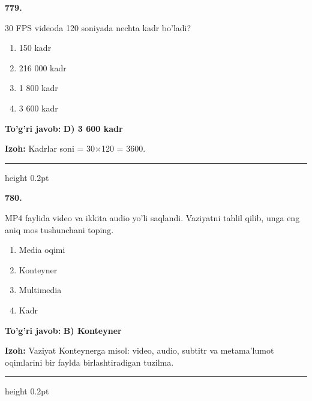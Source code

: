 \documentclass[10pt,a4paper,oneside]{article}
\begin{document}
\noindent\textbf{\color{ink}779.}
\par
30 FPS videoda 120 soniyada nechta kadr bo'ladi?
\begin{enumerate}[label=\Alph*),leftmargin=9mm]
\item 150 kadr
\item 216 000 kadr
\item 1 800 kadr
\item 3 600 kadr
\end{enumerate}
\begin{tcolorbox}[enhanced,breakable,colback=teal!4,colframe=teal!50!black,boxrule=0.5pt,arc=1.1mm,left=3mm,right=3mm,top=1.7mm,bottom=1.7mm,before skip=2mm,after skip=2mm]
\textbf{\color{teal}To'g'ri javob:} \textbf{D) 3 600 kadr}
\par\smallskip
\textbf{Izoh:} Kadrlar soni = 30\ensuremath{\times}120 = 3600.
\end{tcolorbox}
\vspace{2mm}\hrule height 0.2pt \vspace{3mm}

\noindent\textbf{\color{ink}780.}
\par
MP4 faylida video va ikkita audio yo'li saqlandi. Vaziyatni tahlil qilib, unga eng aniq mos tushunchani toping.
\begin{enumerate}[label=\Alph*),leftmargin=9mm]
\item Media oqimi
\item Konteyner
\item Multimedia
\item Kadr
\end{enumerate}
\begin{tcolorbox}[enhanced,breakable,colback=teal!4,colframe=teal!50!black,boxrule=0.5pt,arc=1.1mm,left=3mm,right=3mm,top=1.7mm,bottom=1.7mm,before skip=2mm,after skip=2mm]
\textbf{\color{teal}To'g'ri javob:} \textbf{B) Konteyner}
\par\smallskip
\textbf{Izoh:} Vaziyat Konteynerga misol: video, audio, subtitr va metama'lumot oqimlarini bir faylda birlashtiradigan tuzilma.
\end{tcolorbox}
\vspace{2mm}\hrule height 0.2pt \vspace{3mm}
\end{document}
